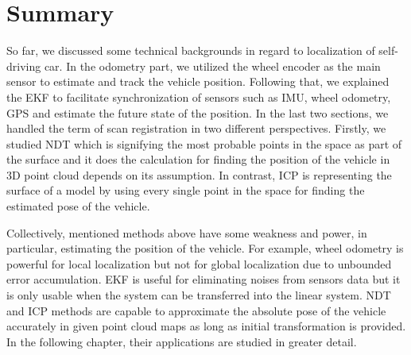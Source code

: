 \section{Summary}\label{sec:summary}
So far, we discussed some technical backgrounds in regard to localization of self-driving car. In the odometry part, we utilized the wheel encoder as the main sensor to estimate and track the vehicle position. Following that, we explained the EKF to facilitate synchronization of sensors such as IMU, wheel odometry, GPS and estimate the future state of the position. In the last two sections, we handled the term of scan registration in two different perspectives. Firstly, we studied NDT which is signifying the most probable points in the space as part of the surface and it does the calculation for finding the position of the vehicle in 3D point cloud depends on its assumption. In contrast, ICP is representing the surface of a model by using every single point in the space for finding the estimated pose of the vehicle. 
\par Collectively, mentioned methods above have some weakness and power, in particular, estimating the position of the vehicle. For example, wheel odometry is powerful for local localization but not for global localization due to unbounded error accumulation. EKF is useful for eliminating noises from sensors data but it is only usable when the system can be transferred into the linear system. NDT and ICP methods are capable to approximate the absolute pose of the vehicle accurately in given point cloud maps as long as initial transformation is provided. In the following chapter, their applications are studied in greater detail. 